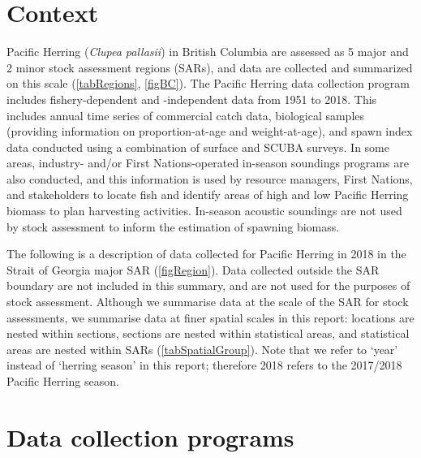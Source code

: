 \documentclass[12pt]{article}\usepackage[]{graphicx}\usepackage[]{color}
\newcommand{\regionName}{Strait of Georgia}
\newcommand{\regionType}{major}
\newcommand{\firstYr}{1951}
\newcommand{\thisYr}{2018}
\newcommand{\fishName}{Pacific Herring}
\newcommand{\scienceName}{\emph{Clupea pallasii}}
\begin{document}
\frontmatter

\section{Context}


\fishName{} (\scienceName{}) in British Columbia are assessed as 5 major and 2 minor stock assessment regions (SARs), and data are collected and summarized on this scale (\autoref{tabRegions}, \autoref{figBC}).
The \fishName{} data collection program includes fishery-dependent and -independent data from \firstYr{} to \thisYr{}.
This includes annual time series of commercial catch data, biological samples (providing information on proportion-at-age and weight-at-age), and spawn index data conducted using a combination of surface and SCUBA surveys.
In some areas, industry- and/or First Nations-operated in-season soundings programs are also conducted, and this information is used by resource managers, First Nations, and stakeholders to locate fish and identify areas of high and low \fishName{} biomass to plan harvesting activities.
In-season acoustic soundings are not used by stock assessment to inform the estimation of spawning biomass.

The following is a description of data collected for \fishName{} in \thisYr{} in the \regionName{} \regionType{} SAR (\autoref{figRegion}).
Data collected outside the SAR boundary are not included in this summary, and are not used for the purposes of stock assessment.
Although we summarise data at the scale of the SAR for stock assessments, we summarise data at finer spatial scales in this report: locations are nested within sections, sections are nested within statistical areas, and statistical areas are nested within SARs (\autoref{tabSpatialGroup}).
\iftoggle{spatialGroup}{For the \regionName{} \regionType{} SAR, we use another level of spatial aggregation which we refer to as a `group'.}{\unskip}
Note that we refer to `year' instead of `herring season' in this report; therefore \thisYr{} refers to the 2017/2018 \fishName{} season.

\section{Data collection programs}
\end{document}
